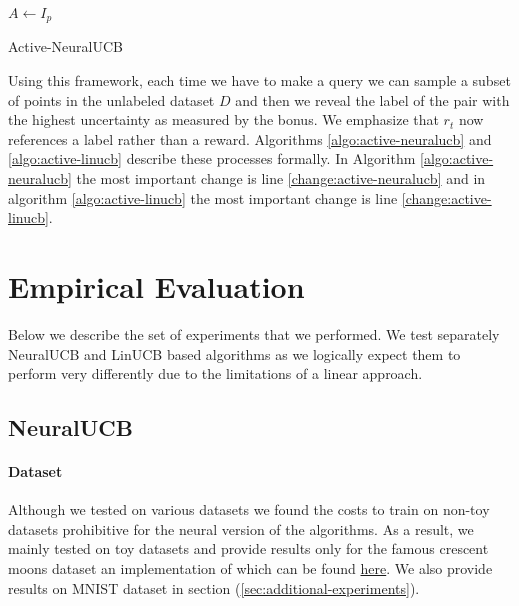 \documentclass{article}
\begin{document}
  \begin{algorithm}
    $A \gets I_{p}$\;
    \caption{Active-NeuralUCB}\label{algo:active-neuralucb}
  \end{algorithm}

Using this framework, each time we have to make a query we can sample a subset of points in the unlabeled dataset $D$  and then we reveal the label of the pair with the highest uncertainty as measured by the bonus.
We emphasize that $r_t$ now references a label rather than a reward.
Algorithms \ref{algo:active-neuralucb} and \ref{algo:active-linucb} describe these processes formally.
In Algorithm \ref{algo:active-neuralucb} the most important change is line \ref{change:active-neuralucb} and in algorithm
\ref{algo:active-linucb} the most important change is line \ref{change:active-linucb}.

\section{Empirical Evaluation}
Below we describe the set of experiments that we performed.
We test separately NeuralUCB and LinUCB based algorithms as we logically expect them to perform
very differently due to the limitations of a linear approach.



\subsection{NeuralUCB}
\paragraph{Dataset}
Although we tested on various datasets we found the costs to train on non-toy datasets prohibitive for the neural version of the algorithms.
As a result, we mainly tested on toy datasets and provide results only for the famous crescent moons dataset an implementation of which can
be found
\href{https://scikit-learn.org/stable/modules/generated/sklearn.datasets.make_moons.html}{here}.
We also provide results on MNIST dataset in section (\ref{sec:additional-experiments}).
\end{document}
